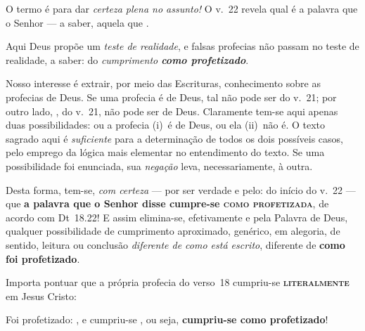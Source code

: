 
    O termo  é para dar \emph{certeza plena no assunto!} O v.~22 revela qual é a palavra que o Senhor  --- a saber, aquela que .

    Aqui Deus propõe um \emph{teste de  realidade},  e  falsas  profecias  não  passam  no  teste  de  realidade,  a  saber:  do
    \emph{cumprimento \textbf{como profetizado}}.

    Nosso interesse é extrair, por meio das Escrituras, conhecimento sobre as profecias de Deus. Se uma profecia é de Deus,  tal
    não pode ser  do v.~21; por outro lado, ,
    do v.~21, não pode ser de Deus. Claramente tem-se aqui apenas duas possibilidades: ou a  profecia  (i)~é  de  Deus,  ou  ela
    (ii)~não é. O texto sagrado aqui é \emph{suficiente} para a determinação de todos os dois possíveis casos, pelo  emprego  da
    lógica  mais  elementar  no  entendimento  do  texto.  Se  uma  possibilidade  foi  enunciada,  sua   \emph{negação}   leva,
    necessariamente, à outra.

    Desta forma, tem-se, \emph{com certeza} --- por ser verdade e pelo:  do início do v.~22 ---  que  \textbf{a
    palavra que o Senhor disse cumpre-se \textsc{como profetizada}}, de acordo com Dt~18.22! E assim elimina-se, efetivamente  e
    pela Palavra de Deus, qualquer possibilidade de cumprimento aproximado,  genérico,  em  alegoria,  de  sentido,  leitura  ou
    conclusão \emph{diferente de como está escrito}, diferente de \textbf{como foi profetizado}.

    Importa pontuar que a própria profecia do verso~18 cumpriu-se \textbf{\textsc{literalmente}} em Jesus Cristo:
 

    Foi profetizado: , e cumpriu-se , ou seja, \textbf{cumpriu-se como profetizado}!

